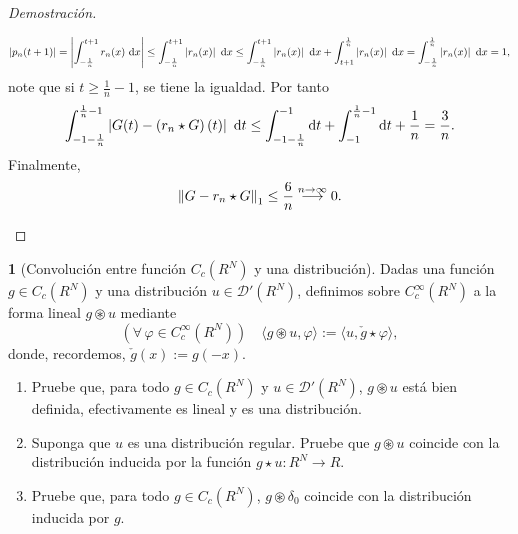 \documentclass[10pt,a4paper]{report}
\newcommand{\abs}[2][y]{\if#1y\left\fi\lvert#2\if#1y\right\fi\rvert}
\newcommand{\norm}[2][y]{{\if#1y\left\fi\lVert#2\if#1y\right\fi\rVert}}
\newcommand{\Real}{R}
\theoremstyle{definition}
\newtheorem{problem}{\color{azul}{Problema}}
\renewcommand{\theproblem}{\Alph{problem}}
\numberwithin{equation}{problem}
\providecommand{\abs}[1]{\left\lvert#1\right\rvert}
\providecommand{\norm}[1]{\left\lVert#1\right\rVert}
\begin{document}
\begin{proof}[\textcolor{rojo}{Demostración}]
\begin{enumerate}[label=\textbf{\theproblem.\arabic{*}.},ref=\theproblem.\arabic{*},parsep=1ex]
\begin{align*}
              	\abs{p_{n}(t+1)} = \abs{\int_{-\frac{1}{n}}^{t+1}r_{n}(x)\ \text{d}x}\leq \int_{-\frac{1}{n}}^{t+1}\abs{r_{n}(x)}\ \text{d}x \leq  \int_{-\frac{1}{n}}^{t+1}\abs{r_{n}(x)}\ \text{d}x + \int_{t+1}^{\frac{1}{n}}\abs{r_{n}(x)}\ \text{d}x = \int_{-\frac{1}{n}}^{\frac{1}{n}}\abs{r_{n}(x)}\ \text{d}x = 1,
              \end{align*}
              note que si $t\geq\frac{1}{n}-1$, se tiene la igualdad. Por tanto
              \begin{align*}
              	\int_{-1-\frac{1}{n}}^{\frac{1}{n}-1}\abs{G(t)-\left(r_{n}\star G\right)(t)}\ \text{d}t\leq \int_{-1-\frac{1}{n}}^{-1}\text{d}t + \int_{-1}^{\frac{1}{n}-1}\text{d}t + \frac{1}{n} = \frac{3}{n}.
              \end{align*}
              Finalmente,
              \begin{align*}
              	\norm{G-r_{n}\star G}_{1} \leq \frac{6}{n} \overset{n\to\infty}{\longrightarrow} 0.
              \end{align*}
    	\end{enumerate}
    \end{proof}
    \newpage
    \begin{problem}[Convolución entre función $C_c(\Real^N)$ y una distribución]
    	Dadas una función $g \in C_c(\Real^N)$ y una distribución $u \in \mathcal{D}'(\Real^N)$, definimos sobre $C^\infty_c(\Real^N)$ a la forma lineal $g \circledast u$ mediante
    	\begin{equation*}
    		\left(\forall\,\varphi\in C^\infty_c(\Real^N)\right) \quad
    		\langle g \circledast u, \varphi \rangle := \langle u, \check g \star \varphi \rangle,
    	\end{equation*}
    	donde, recordemos, $\check g(x) := g(-x)$.
    	
    	\begin{enumerate}[label=\textbf{\theproblem.\arabic{*}.},ref=\theproblem.\arabic{*},parsep=1ex]
    		\item\label{it:CFD-distribution}
    		Pruebe que, para todo $g \in C_c(\Real^N)$ y $u \in \mathcal{D}'(\Real^N)$, $g \circledast u$ está bien definida, efectivamente es lineal y es una distribución.
    		\item\label{it:CFD-compatible}
    		Suponga que $u$ es una distribución regular.
    		Pruebe que $g \circledast u$ coincide con la distribución inducida por la función $g \star u \colon \Real^N \to \Real$.
    		\item\label{it:CFD-delta}
    		Pruebe que, para todo $g \in C_c(\Real^N)$, $g \circledast \delta_0$ coincide con la distribución inducida por $g$.
    	\end{enumerate}
    \end{problem}
\end{document}
